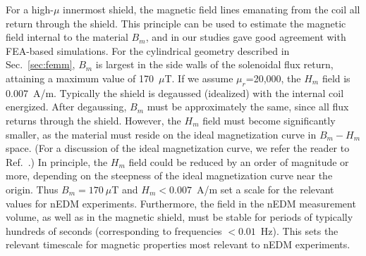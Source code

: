 For a high-$\mu$ innermost shield, the magnetic field lines emanating
from the coil all return through the shield.  This principle can be
used to estimate the magnetic field internal to the material $B_m$,
and in our studies gave good agreement with FEA-based simulations.
For the cylindrical geometry described in Sec.~\ref{sec:femm}, $B_m$
is largest in the side walls of the solenoidal flux return, attaining
a maximum value of 170~$\mu$T.  If we assume $\mu_r$=20,000, the $H_m$
field is 0.007~A/m.  Typically the shield is degaussed (idealized)
with the internal coil energized.  After degaussing, $B_m$ must be
approximately the same, since all flux returns through the shield.
However, the $H_m$ field must become significantly smaller, as the
material must reside on the ideal magnetization curve in $B_m-H_m$
space.  (For a discussion of the ideal magnetization curve, we refer
the reader to Ref.~\cite{bib:bozorth}.)  In principle, the $H_m$ field
could be reduced by an order of magnitude or more, depending on the
steepness of the ideal magnetization curve near the origin.  Thus
$B_m=170~\mu$T and $H_m<0.007$~A/m set a scale for the relevant values
for nEDM experiments.  Furthermore, the field in the nEDM measurement
volume, as well as in the magnetic shield, must be stable for periods
of typically hundreds of seconds (corresponding to frequencies
$<0.01$~Hz).  This sets the relevant timescale for magnetic properties
most relevant to nEDM experiments.
